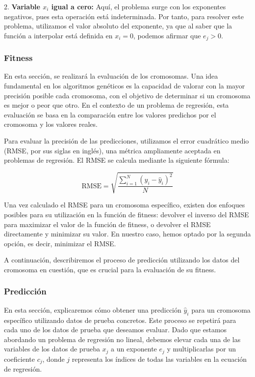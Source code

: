 \documentclass[conference,a4paper]{IEEEtran}
\begin{document}
2. \textbf{Variable \( x_i \) igual a cero:} Aquí, el problema surge con los exponentes negativos, pues esta operación está indeterminada. Por tanto, para resolver este problema, utilizamos el valor absoluto del exponente, ya que al saber que la función a interpolar está definida en \( x_i = 0 \), podemos afirmar que \( e_j > 0 \).


\subsubsection{Fitness}
En esta sección, se realizará la evaluación de los cromosomas. Una idea fundamental en los algoritmos genéticos es la capacidad de valorar con la mayor precisión posible cada cromosoma, con el objetivo de determinar si un cromosoma es mejor o peor que otro. En el contexto de un problema de regresión, esta evaluación se basa en la comparación entre los valores predichos por el cromosoma y los valores reales.

Para evaluar la precisión de las predicciones, utilizamos el error cuadrático medio (RMSE, por sus siglas en inglés), una métrica ampliamente aceptada en problemas de regresión. El RMSE se calcula mediante la siguiente fórmula:

\[
\text{RMSE} = \sqrt{\frac{\sum_{i=1}^{N} (y_i - \hat{y}_i)^2}{N}}
\]


Una vez calculado el RMSE para un cromosoma específico, existen dos enfoques posibles para su utilización en la función de fitness: devolver el inverso del RMSE para maximizar el valor de la función de fitness, o devolver el RMSE directamente y minimizar su valor. En nuestro caso, hemos optado por la segunda opción, es decir, minimizar el RMSE.

A continuación, describiremos el proceso de predicción utilizando los datos del cromosoma en cuestión, que es crucial para la evaluación de su fitness.

\subsubsection{Predicción}
En esta sección, explicaremos cómo obtener una predicción \(\hat{y}_i\) para un cromosoma específico utilizando datos de prueba concretos. Este proceso se repetirá para cada uno de los datos de prueba que deseamos evaluar. Dado que estamos abordando un problema de regresión no lineal, debemos elevar cada una de las variables de los datos de prueba \(x_j\) a un exponente \(e_j\) y multiplicarlas por un coeficiente \(c_j\), donde \(j\) representa los índices de todas las variables en la ecuación de regresión. 
\end{document}
